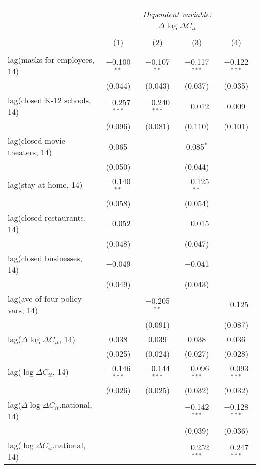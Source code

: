 \begin{tabular}{@{\extracolsep{1pt}}lcccc} 
\\[-1.8ex]\hline 
\hline \\[-1.8ex] 
 & \multicolumn{4}{c}{\textit{Dependent variable:}} \\ 
\cline{2-5} 
 & \multicolumn{4}{c}{$\Delta \log \Delta C_{it}$} \\ 
\\[-1.8ex] & (1) & (2) & (3) & (4)\\ 
\hline \\[-1.8ex] 
 lag(masks for employees, 14) & $-$0.100$^{**}$ & $-$0.107$^{**}$ & $-$0.117$^{***}$ & $-$0.122$^{***}$ \\ 
  & (0.044) & (0.043) & (0.037) & (0.035) \\ 
  lag(closed K-12 schools, 14) & $-$0.257$^{***}$ & $-$0.240$^{***}$ & $-$0.012 & 0.009 \\ 
  & (0.096) & (0.081) & (0.110) & (0.101) \\ 
  lag(closed movie theaters, 14) & 0.065 &  & 0.085$^{*}$ &  \\ 
  & (0.050) &  & (0.044) &  \\ 
  lag(stay at home, 14) & $-$0.140$^{**}$ &  & $-$0.125$^{**}$ &  \\ 
  & (0.058) &  & (0.054) &  \\ 
  lag(closed restaurants, 14) & $-$0.052 &  & $-$0.015 &  \\ 
  & (0.048) &  & (0.047) &  \\ 
  lag(closed businesses, 14) & $-$0.049 &  & $-$0.041 &  \\ 
  & (0.049) &  & (0.043) &  \\ 
  lag(ave of four policy vars, 14) &  & $-$0.205$^{**}$ &  & $-$0.125 \\ 
  &  & (0.091) &  & (0.087) \\ 
  lag($\Delta \log \Delta C_{it}$, 14) & 0.038 & 0.039 & 0.038 & 0.036 \\ 
  & (0.025) & (0.024) & (0.027) & (0.028) \\ 
  lag($\log \Delta C_{it}$, 14) & $-$0.146$^{***}$ & $-$0.144$^{***}$ & $-$0.096$^{***}$ & $-$0.093$^{***}$ \\ 
  & (0.026) & (0.025) & (0.032) & (0.032) \\ 
  lag($\Delta \log \Delta C_{it}$.national, 14) &  &  & $-$0.142$^{***}$ & $-$0.128$^{***}$ \\ 
  &  &  & (0.039) & (0.036) \\ 
  lag($\log \Delta C_{it}$.national, 14) &  &  & $-$0.252$^{***}$ & $-$0.247$^{***}$ \\ 

\end{tabular}

